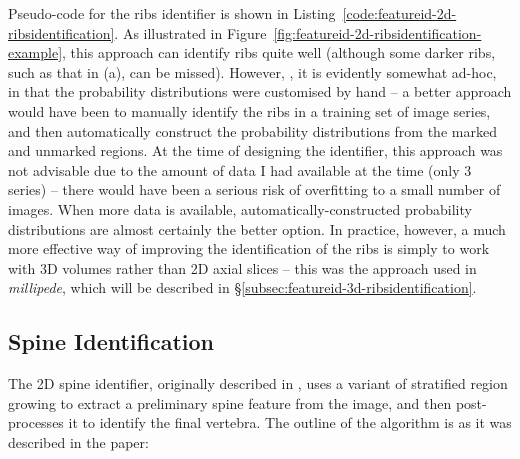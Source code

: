 Pseudo-code for the ribs identifier is shown in Listing~\ref{code:featureid-2d-ribsidentification}. As illustrated in Figure~\ref{fig:featureid-2d-ribsidentification-example}, this approach can identify ribs quite well (although some darker ribs, such as that in (a), can be missed). However, , it is evidently somewhat ad-hoc, in that the probability distributions were customised by hand -- a better approach would have been to manually identify the ribs in a training set of image series, and then automatically construct the probability distributions from the marked and unmarked regions. At the time of designing the identifier, this approach was not advisable due to the amount of data I had available at the time (only $3$ series) -- there would have been a serious risk of overfitting to a small number of images. When more data is available, automatically-constructed probability distributions are almost certainly the better option. In practice, however, a much more effective way of improving the identification of the ribs is simply to work with 3D volumes rather than 2D axial slices -- this was the approach used in \emph{millipede}, which will be described in \S\ref{subsec:featureid-3d-ribsidentification}.


\newpage

\subsection{Spine Identification}
\label{subsec:featureid-2d-spine}


The 2D spine identifier, originally described in \cite{gvcispa09}, uses a variant of stratified region growing to extract a preliminary spine feature from the image, and then post-processes it to identify the final vertebra. The outline of the algorithm is as it was described in the paper:

